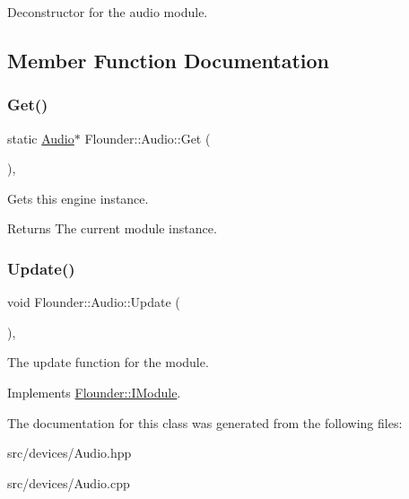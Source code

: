 Deconstructor for the audio module. 



\subsection{Member Function Documentation}
\mbox{\label{class_flounder_1_1_audio_a4432ad49cca82937039c9ade8c3ce54a}} 
\subsubsection{\texorpdfstring{Get()}{Get()}}
{\footnotesize\ttfamily static \hyperlink{class_flounder_1_1_audio}{Audio}$\ast$ Flounder\+::\+Audio\+::\+Get (\begin{DoxyParamCaption}{ }\end{DoxyParamCaption})\hspace{0.3cm}{\ttfamily [inline]}, {\ttfamily [static]}}



Gets this engine instance. 

\begin{DoxyReturn}{Returns}
The current module instance. 
\end{DoxyReturn}
\mbox{\label{class_flounder_1_1_audio_aa737515b3f9b047546d8b892b981d85d}} 
\subsubsection{\texorpdfstring{Update()}{Update()}}
{\footnotesize\ttfamily void Flounder\+::\+Audio\+::\+Update (\begin{DoxyParamCaption}{ }\end{DoxyParamCaption})\hspace{0.3cm}{\ttfamily [override]}, {\ttfamily [virtual]}}



The update function for the module. 



Implements \hyperlink{class_flounder_1_1_i_module_a1812bb03a6990e4698a10c043fa25fde}{Flounder\+::\+I\+Module}.



The documentation for this class was generated from the following files\+:\begin{DoxyCompactItemize}
\item 
src/devices/Audio.\+hpp\item 
src/devices/Audio.\+cpp\end{DoxyCompactItemize}
